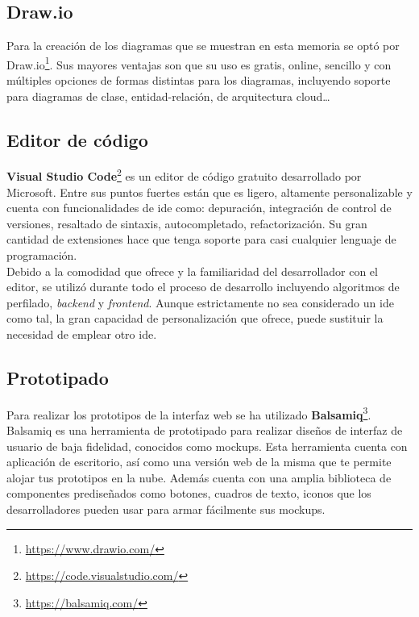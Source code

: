 \subsection{Draw.io}

Para la creación de los diagramas que se muestran en esta memoria se optó por Draw.io\footnote{\url{https://www.drawio.com/}}. Sus mayores ventajas son que su uso es gratis, online, sencillo y con múltiples opciones de formas distintas para los diagramas, incluyendo soporte para diagramas de clase, entidad-relación, de arquitectura cloud\dots

\subsection{Editor de código}

\textbf{Visual Studio Code}\footnote{\url{https://code.visualstudio.com/}} es un editor de código gratuito desarrollado por Microsoft. Entre sus puntos fuertes están que es ligero, altamente personalizable y cuenta con funcionalidades de \acrfull{ide} como: depuración, integración de control de versiones, resaltado de sintaxis, autocompletado, refactorización. Su gran cantidad de extensiones hace que tenga soporte para casi cualquier lenguaje de programación.\\
Debido a la comodidad que ofrece y la familiaridad del desarrollador con el editor, se utilizó durante todo el proceso de desarrollo incluyendo algoritmos de perfilado, \textit{backend} y \textit{frontend}. Aunque estrictamente no sea considerado un \acrshort{ide} como tal, la gran capacidad de personalización que ofrece, puede sustituir la necesidad de emplear otro \acrshort{ide}.%

\subsection{Prototipado}

Para realizar los prototipos de la interfaz web se ha utilizado \textbf{Balsamiq}\footnote{\url{https://balsamiq.com/}}. Balsamiq es una herramienta de prototipado para realizar diseños de interfaz de usuario de baja fidelidad, conocidos como \gls{mockups}. Esta herramienta cuenta con aplicación de escritorio, así como una versión web de la misma que te permite alojar tus prototipos en la nube. Además cuenta con una amplia biblioteca de componentes prediseñados como botones, cuadros de texto, iconos que los desarrolladores pueden usar para armar fácilmente sus \gls{mockups}.